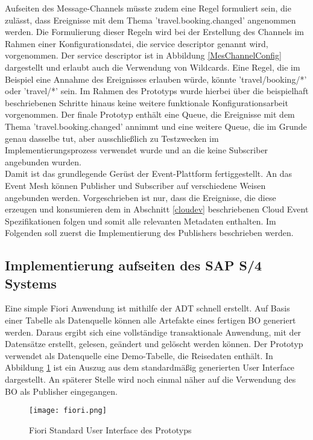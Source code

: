   Aufseiten des Message-Channels müsste zudem eine Regel formuliert sein, die zulässt, dass Ereignisse mit dem Thema 'travel.booking.changed' angenommen werden. Die Formulierung dieser Regeln wird bei der Erstellung des Channels im Rahmen einer Konfigurationsdatei, die service descriptor genannt wird, vorgenommen. Der service descriptor ist in Abbildung \ref{MesChannelConfig} dargestellt und erlaubt auch die Verwendung von Wildcards. Eine Regel, die im Beispiel eine Annahme des Ereignisses erlauben würde, könnte 'travel/booking/*' oder 'travel/*' sein. Im Rahmen des Prototyps wurde hierbei über die beispielhaft beschriebenen Schritte hinaus keine weitere funktionale Konfigurationsarbeit vorgenommen. Der finale Prototyp enthält eine Queue, die Ereignisse mit dem Thema 'travel.booking.changed' annimmt und eine weitere Queue, die im Grunde genau dasselbe tut, aber ausschließlich zu Testzwecken im Implementierungsprozess verwendet wurde und an die keine Subscriber angebunden wurden.\\

  Damit ist das grundlegende Gerüst der Event-Plattform fertiggestellt. An das Event Mesh können Publisher und Subscriber auf verschiedene Weisen angebunden werden. Vorgeschrieben ist nur, dass die Ereignisse, die diese erzeugen und konsumieren dem in Abschnitt \ref{cloudev} beschriebenen Cloud Event Spezifikationen folgen und somit alle relevanten Metadaten enthalten. Im Folgenden soll zuerst die Implementierung des Publishers beschrieben werden.\\

  \subsection{Implementierung aufseiten des SAP S/4 Systems}
  Eine simple Fiori Anwendung ist mithilfe der \ac{ADT} schnell erstellt. Auf Basis einer Tabelle als Datenquelle können alle Artefakte eines fertigen \ac{BO} generiert werden. Daraus ergibt sich eine vollständige transaktionale Anwendung, mit der Datensätze erstellt, gelesen, geändert und gelöscht werden können. Der Prototyp verwendet als Datenquelle eine Demo-Tabelle, die Reisedaten enthält. In Abbildung \ref{fiori} ist ein Auszug aus dem standardmäßig generierten User Interface dargestellt. An späterer Stelle wird noch einmal näher auf die Verwendung des \ac{BO} als Publisher eingegangen.\\
  \begin{figure}[H]
    \centering
    \texttt{[image: fiori.png]}
    \caption[Screenshot des Prototyps]{Fiori Standard User Interface des Prototyps \footnotemark}
    \label{fiori}
  \end{figure}

